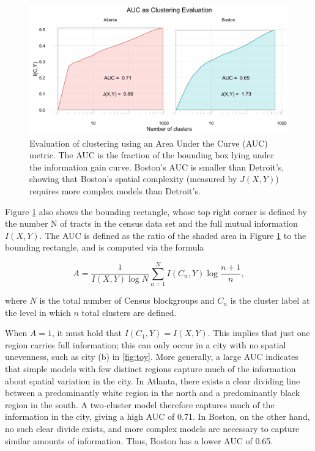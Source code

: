 	\begin{figure}
		\centering
		\includegraphics[width=\textwidth]{figs/AUC_illustration.png}
		\caption{Evaluation of clustering using an Area Under the Curve (AUC) metric. The AUC is the fraction of the bounding box lying under the information gain curve. Boston's AUC is smaller than Detroit's, showing that Boston's spatial complexity (measured by $J(X,Y)$) requires more complex models than Detroit's.}
		\label{fig:AUC}
	\end{figure}

	Figure \ref{fig:AUC} also shows the bounding rectangle, whose top right corner is defined by the number N of tracts in the census data set and the full mutual information $I(X,Y)$. The AUC is defined as the ratio of the shaded area in Figure \ref{fig:AUC} to the bounding rectangle, and is computed via the formula 

	\begin{equation}
		A = \frac{1}{I(X,Y) \log N }\sum_{n = 1}^N I(C_n, Y) \log \frac{n + 1}{n}  ,
	\end{equation}

	where $N$ is the total number of Census blockgroups and $C_n$ is the cluster label at the level in which $n$ total clusters are defined.

	When $A = 1$, it must hold that $I(C_1,Y) = I(X,Y)$. This implies that just one region carries full information; this can only occur in a city with no spatial unevenness, such as city (b) in \ref{fig:toy}. More generally, a large AUC indicates that simple models with few distinct regions capture much of the information about spatial variation in the city. In Atlanta, there exists a clear dividing line between a predominantly white region in the north and a predominantly black region in the south. A two-cluster model therefore captures much of the information in the city, giving a high AUC of 0.71. In Boston, on the other hand, no such clear divide exists, and more complex models are necessary to capture similar amounts of information. Thus, Boston has a lower AUC of 0.65. 

